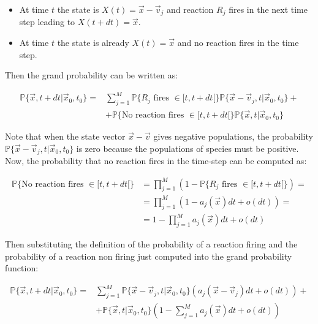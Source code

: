     \begin{multicols}{2}
      \begin{itemize}
        \item At time $t$ the state is $X(t) = \vec{x}-\vec{v}_j$ and reaction $R_j$ fires in the next time step leading to $X(t+dt) = \vec{x}$.
        \item At time $t$ the state is already $X(t)=\vec{x}$ and no reaction fires in the time step.
      \end{itemize}
    \end{multicols}

      Then the grand probability can be written as:

      \begin{align*}
        \mathbb{P}\{\vec{x}, t+dt|\vec{x}_0, t_0\} =& \sum\limits_{j=1}^M\mathbb{P}\{R_j\text{ fires }\in[t, t+dt[\}\mathbb{P}\{\vec{x}-\vec{v}_j, t|\vec{x}_0, t_0\} +\\
                                                    &+\mathbb{P}\{\text{No reaction fires }\in[t, t+dt[\}\mathbb{P}\{\vec{x}, t|\vec{x}_0, t_0\}
      \end{align*}

      Note that when the state vector $\vec{x}-\vec{v}$ gives negative populations, the probability $\mathbb{P}\{\vec{x}-\vec{v}_j, t|\vec{x}_0, t_0\}$ is zero because the populations of species must be positive.
      Now, the probability that no reaction fires in the time-step can be computed as:

      \begin{align*}
        \mathbb{P}\{\text{No reaction fires }\in[t,t+dt[\} &=\prod\limits_{j=1}^M(1-\mathbb{P}\{R_j\text{ fires }\in[t, t+dt[\}) =\\
                                                           &=\prod\limits_{j=1}^M(1-a_j(\vec{x})dt+o(dt))=\\
                                                           &=1-\prod\limits_{j=1}^M a_j(\vec{x})dt+o(dt)
      \end{align*}

      Then substituting the definition of the probability of a reaction firing and the probability of a reaction non firing just computed into the grand probability function:

      \begin{align*}
        \mathbb{P}\{\vec{x}, t+dt|\vec{x}_0, t_0\} =& \sum\limits_{j=1}^M\mathbb{P}\{\vec{x}-\vec{v}_j, t|\vec{x}_0, t_0\}(a_j(\vec{x}-\vec{v}_j)dt + o(dt)) +\\
                                                    &+\mathbb{P}\{\vec{x}, t|\vec{x}_0, t_0\}\left(1-\sum\limits_{j=1}^Ma_j(\vec{x})dt+o(dt)\right)
      \end{align*}

